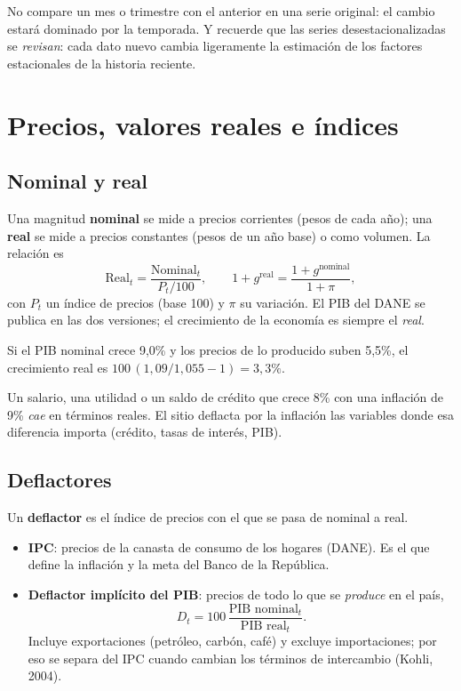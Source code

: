 \begin{alerta}
No compare un mes o trimestre con el anterior en una serie original: el cambio estará dominado por la temporada.
Y recuerde que las series desestacionalizadas se \emph{revisan}: cada dato nuevo cambia ligeramente la
estimación de los factores estacionales de la historia reciente.
\end{alerta}

\chapter{Precios, valores reales e índices}
\label{es:f:precios}

\section{Nominal y real}
Una magnitud \textbf{nominal} se mide a precios corrientes (pesos de cada año); una \textbf{real} se mide a precios
constantes (pesos de un año base) o como volumen. La relación es
\[
\text{Real}_t=\frac{\text{Nominal}_t}{P_t/100},
\qquad 1+g^{\text{real}}=\frac{1+g^{\text{nominal}}}{1+\pi},
\]
con $P_t$ un índice de precios (base 100) y $\pi$ su variación. El PIB del DANE se publica en las dos versiones;
el crecimiento de la economía es siempre el \emph{real}.

\begin{dato}
Si el PIB nominal crece 9,0\% y los precios de lo producido suben 5,5\%, el crecimiento real es
$100\,(1{,}09/1{,}055-1)=3{,}3\%$.
\end{dato}

\begin{alerta}
Un salario, una utilidad o un saldo de crédito que crece 8\% con una inflación de 9\% \emph{cae} en términos
reales. El sitio deflacta por la inflación las variables donde esa diferencia importa (crédito, tasas de
interés, PIB).
\end{alerta}

\section{Deflactores}
\label{es:f:deflactor}
Un \textbf{deflactor} es el índice de precios con el que se pasa de nominal a real.
\begin{itemize}
\item \textbf{IPC}: precios de la canasta de consumo de los hogares (DANE). Es el que define la inflación y la
  meta del Banco de la República.
\item \textbf{Deflactor implícito del PIB}: precios de todo lo que se \emph{produce} en el país,
  \[
  D_t = 100\,\frac{\text{PIB nominal}_t}{\text{PIB real}_t}.
  \]
  Incluye exportaciones (petróleo, carbón, café) y excluye importaciones; por eso se separa del IPC cuando
  cambian los términos de intercambio (Kohli, 2004).
\end{itemize}

